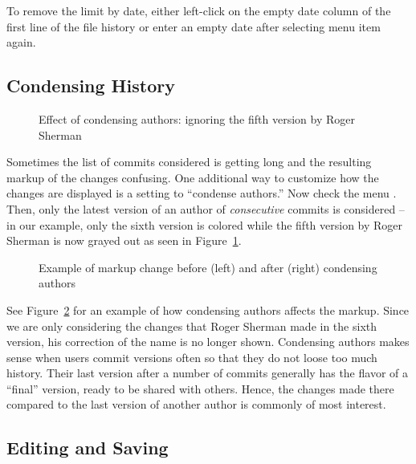 To remove the limit by date, either left-click on the empty date column of the first line of the file history or enter an empty date after selecting menu item  again.

\subsection{Condensing History}

\begin{figure}
\centering
{}
\caption[Effect of condensing authors]{Effect of condensing authors: ignoring the fifth version by Roger Sherman} \label{fig:svn-emacs-condense-on}  
\end{figure}
Sometimes the list of commits considered is getting long and the resulting markup of the changes confusing.  One additional way to customize how the changes are displayed is a setting to ``condense authors.''  Now check the menu .  Then, only the latest version of an author of \textit{consecutive} commits is considered -- in our example, only the sixth version is colored while the fifth version by Roger Sherman is now grayed out as seen in Figure~\ref{fig:svn-emacs-condense-on}.

\begin{figure}
\centering
{}
\hspace{1em}
\caption[Example of markup change when condensing authors]{Example of markup change before (left) and after (right) condensing authors} \label{fig:svn-emacs-condense-before-after}
\end{figure}
See Figure~\ref{fig:svn-emacs-condense-before-after} for an example of how condensing authors affects the markup.  Since we are only considering the changes that Roger Sherman made in the sixth version, his correction of the name is no longer shown.  Condensing authors makes sense when users commit versions often so that they do not loose too much history.  Their last version after a number of commits generally has the flavor of a ``final'' version, ready to be shared with others.  Hence, the changes made there compared to the last version of another author is commonly of most interest.

\subsection{Editing and Saving} \label{sec:svn-editing}

